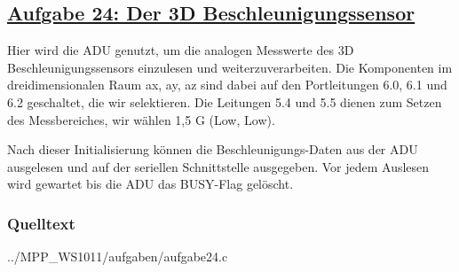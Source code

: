 \subsection
{\href{http://cst.mi.fu-berlin.de/intern/19606-P-MPP/Aufgaben/040802.html}
{Aufgabe 24: Der 3D Beschleunigungssensor}}

Hier wird die ADU genutzt, um die analogen Messwerte des 3D
Beschleunigungssensors einzulesen und weiterzuverarbeiten. Die
Komponenten im dreidimensionalen Raum ax, ay, az sind dabei auf den
Portleitungen 6.0, 6.1 und 6.2 geschaltet, die wir selektieren. Die
Leitungen 5.4 und 5.5 dienen zum Setzen des Messbereiches, wir wählen
1,5 G (Low, Low).

Nach dieser Initialisierung können die Beschleunigungs-Daten
aus der ADU ausgelesen und auf der seriellen Schnittstelle
ausgegeben. Vor jedem Auslesen wird gewartet bis die ADU das BUSY-Flag
gelöscht.

\subsubsection*{Quelltext}


{../MPP_WS1011/aufgaben/aufgabe24.c}
